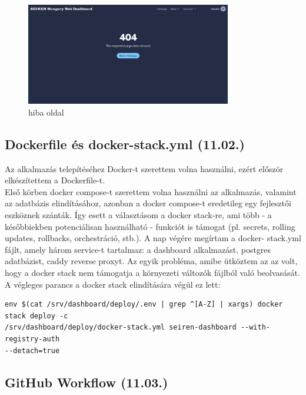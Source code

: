 \documentclass[a4paper]{article}
\begin{document}
\begin{figure}[ht]
  \centering
  \includegraphics[width = 0.8\textwidth]{images/error_page.png}
  \caption{hiba oldal}
  \label{fig:error_page}
\end{figure}

\subsection{Dockerfile és docker-stack.yml (11.02.)}

Az alkalmazás telepítéséhez Docker-t szerettem volna használni, ezért először elkészítettem a
Dockerfile-t.\\

Első körben docker compose-t szerettem volna használni az alkalmazás, valamint az adatbázis
elindításához, azonban a docker compose-t eredetileg egy fejlesztői eszköznek szánták. Így esett a
választásom a docker stack-re, ami több - a későbbiekben potenciálisan használható - funkciót is
támogat (pl. secrets, rolling updates, rollbacks, orchestráció, stb.). A nap végére megírtam a docker-
stack.yml fájlt, amely három service-t tartalmaz: a dashboard alkalmazást, postgres adatbázist, caddy
reverse proxyt. Az egyik probléma, amibe ütköztem az az volt, hogy a docker stack nem támogatja a
környezeti változók fájlból való beolvasását. A végleges parancs a docker stack elindítására végül ez
lett:

\FloatBarrier
\begin{verbatim}
env $(cat /srv/dashboard/deploy/.env | grep ^[A-Z] | xargs) docker stack deploy -c
/srv/dashboard/deploy/docker-stack.yml seiren-dashboard --with-registry-auth
--detach=true
\end{verbatim}

\subsection{GitHub Workflow (11.03.)}
\end{document}
